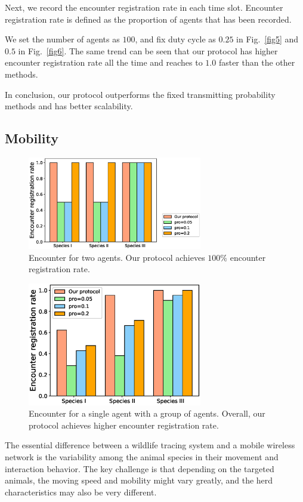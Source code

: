 Next, we record the encounter registration rate in each time slot.
Encounter registration rate is defined as the proportion of agents that has been 
recorded. 

We set the number of agents as $100$, and fix
duty cycle as $0.25$ in Fig.~\ref{fig5} and $0.5$ in Fig.~\ref{fig6}.
The same trend can be seen that our protocol has higher encounter registration rate
all the time and reaches to $1.0$ faster than the other methods.

In conclusion, our protocol outperforms the fixed transmitting probability methods 
and has better scalability. 

\subsection{Mobility}

\begin{figure}[h]
    \centering
    \includegraphics[width=3in]{figures/figure7.eps}
    \caption{Encounter for two agents. Our protocol
    achieves $100\%$ encounter registration rate.}
    \label{fig7}
\end{figure}

\begin{figure}[h]
    \centering
    \includegraphics[width=3in]{figures/figure8.eps}
    \caption{Encounter for a single 
    agent with a group of agents. Overall, our protocol
    achieves higher encounter registration rate.}
    \label{fig8}
\end{figure}

The essential difference between a wildlife tracing system
and a mobile wireless network is the variability among the animal
species in their movement and interaction behavior.
The key challenge is that depending on the targeted animals, 
the moving speed and mobility might vary greatly, and 
the herd characteristics may also be very different.

